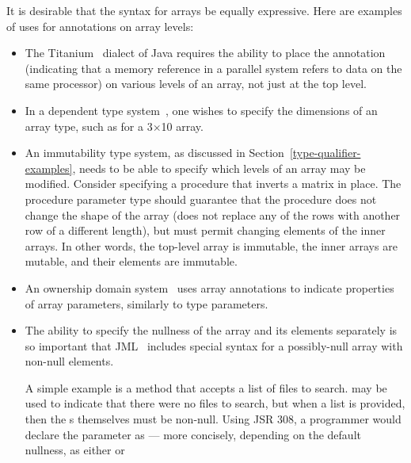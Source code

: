 \documentclass[10pt]{article}
\begin{document}
It is desirable that the syntax for arrays be equally expressive.
Here are examples of uses for annotations on array levels:
\begin{itemize}
\item
  The Titanium~\cite{YelickSPMLKHGGCA1998} dialect of Java requires the
  ability to place the
   annotation (indicating that a memory reference in a parallel
  system refers to data on the same processor) on various levels of an
  array, not just at the top level.
\item
  In a dependent type system~\cite{PfenningF:deptlp,Xi1998,Xi-Pfenning99},
  one wishes to specify the dimensions of an
  array type, such as  for a
  3$\times$10 array.
\item
  An immutability type system, as discussed in Section~\ref{type-qualifier-examples},
  needs to be able to specify which levels of
  an array may be modified.  Consider specifying a procedure that inverts a
  matrix in place.  The procedure parameter type should guarantee that the procedure
  does not change the shape of the array (does not replace any of the rows
  with another row of a different length), but must permit changing
  elements of the inner arrays.  In other words, the top-level array is
  immutable, the inner arrays are mutable, and their elements
  are immutable.
\item
  An ownership domain system~\cite{AbiAntounA2006:OOPSLA} uses array
  annotations to indicate properties of array parameters, similarly to type
  parameters.
\item
  \newcommand{\bs}{\char"5C}
  The ability to specify the nullness of the array and its elements
  separately is so important that JML~\cite{LeavensBR2006:JML} includes
  special syntax \code{\bs nonnullelements(a)} for a possibly-null array
   with non-null elements.

  A simple example is a method that accepts a list of files to search.
   may be used to indicate that there were no files to search,
  but when a list is provided, then the s themselves must be
  non-null.  Using JSR 308, a programmer would declare the parameter as
   --- more concisely,
  depending on the default nullness, as either  or 


\end{itemize}
\end{document}
